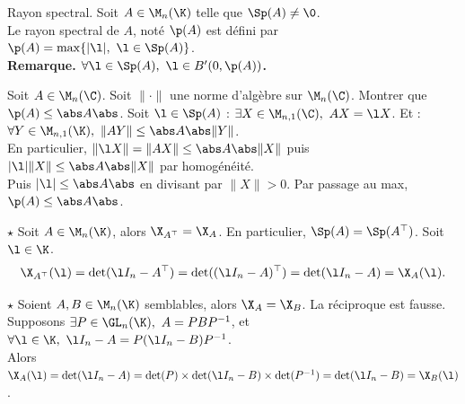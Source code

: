 \documentclass[11pt]{article}
\begin{document}
\vspace*{-0.5cm}

\begin{defi}{Rayon spectral.}{}
    Soit $A\in \M_n(\K)$ telle que $\Sp(A)\neq\0$.\\
    Le rayon spectral de $A$, noté $\p(A)$ est défini par $\p(A)=\max\{|\l|, ~ \l \in \Sp(A)\}$.\\
    \bf{Remarque.} $\forall \l \in \Sp(A), ~ \l \in B'(0,\p(A))$.
\end{defi}

\vspace*{-0.5cm}

\begin{exercice}{}{}
    Soit $A\in \M_n(\C)$. Soit $\|\cdot\|$ une norme d'algèbre sur $\M_n(\C)$. Montrer que $\p(A)\leq\abs A\abs$.
    \tcblower
    Soit $\l\in\Sp(A)$ : $\exists X \in \M_{n,1}(\C), ~ AX=\l X$. Et : $\forall Y \in \M_{n,1}(\K), ~ \|AY\|\leq\abs A\abs\|Y\|$.\\
    En particulier, $\|\l X\| = \|AX\| \leq \abs A \abs \|X\|$ puis $|\l|\|X\|\leq\abs A\abs \|X\|$ par homogénéité.\\
    Puis $|\l|\leq\abs A\abs$ en divisant par $\|X\|>0$. Par passage au max, $\p(A)\leq\abs A\abs$.
\end{exercice}

\vspace*{-0.5cm}

\begin{prop}{$\star$}{}
    Soit $A\in \M_n(\K)$, alors $\X_{A^\top}=\X_A$. En particulier, $\Sp(A)=\Sp(A^\top)$.
    \tcblower
    Soit $\l \in \K$.
    \begin{equation*}
        \X_{A^{\top}}(\l) = \det(\l I_n - A^\top) = \det((\l I_n - A)^\top) = \det(\l I_n - A) = \X_A(\l).
    \end{equation*}
\end{prop}

\vspace*{-0.5cm}

\begin{prop}{$\star$}{}
    Soient $A,B\in \M_n(\K)$ semblables, alors $\X_A=\X_B$. La réciproque est fausse.
    \tcblower
    Supposons $\exists P \in \GL_n(\K), ~ A=PBP^{-1}$, et $\forall \l \in \K, ~ \l I_n - A = P(\l I_n - B)P^{-1}$.\\
    Alors $\X_A(\l)=\det(\l I_n - A) = \det(P)\times\det(\l I_n - B)\times \det(P^{-1})=\det(\l I_n - B) = \X_B(\l)$.
\end{prop}
\end{document}
